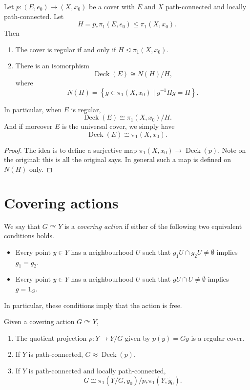 \begin{proposition}
\label{proposition-deck-normalizer}
Let $p:(E,e_0)\to(X,x_0)$ be a cover
with $E$ and $X$ path-connected and
locally path-connected. Let
$$
H=p_*\pi_1(E,e_0)\leq\pi_1(X,x_0).
$$
Then
\begin{enumerate}
\item The cover is regular if and only
if $H\trianglelefteq\pi_1(X,x_0)$.
\item There is an isomorphism
$$
\operatorname{Deck}(E)\cong N(H)/H,
$$
where
$$
N(H)=\left\{g\in\pi_1(X,x_0)
\mid g^{-1}Hg=H\right\}.
$$
\end{enumerate}
In particular, when $E$ is regular,
$$
\operatorname{Deck}(E)\cong
\pi_1(X,x_0)/H.
$$
And if moreover $E$ is the universal
cover, we simply have
$$
\operatorname{Deck}(E)\cong
\pi_1(X,x_0).
$$
\end{proposition}

\begin{proof}
The idea is to define a surjective map
$\pi_1(X,x_0)\to
\operatorname{Deck}(p)$.
Note on the original: this is all the
original says. In general such a map is
defined on $N(H)$ only.
\end{proof}

\section{Covering actions}
\label{section-covering-actions}

\begin{definition}
\label{definition-covering-action}
We say that $G\curvearrowright Y$ is a
{\it covering action} if either of the
following two equivalent conditions
holds.
\begin{itemize}
\item Every point $y\in Y$ has a
neighbourhood $U$ such that
$g_1U\cap g_2U\neq\emptyset$ implies
$g_1=g_2$.
\item Every point $y\in Y$ has a
neighbourhood $U$ such that
$gU\cap U\neq\emptyset$ implies
$g=1_G$.
\end{itemize}
In particular, these conditions imply
that the action is free.
\end{definition}

\begin{proposition}
\label{proposition-covering-action}
Given a covering action
$G\curvearrowright Y$,
\begin{enumerate}
\item The quotient projection
$p:Y\to Y/G$ given by $p(y)=Gy$ is a
regular cover.
\item If $Y$ is path-connected,
$G\approx\operatorname{Deck}(p)$.
\item If $Y$ is path-connected and
locally path-connected,
$$
G\cong\pi_1(Y/G,y_0)\big/
p_*\pi_1(Y,\tilde{y}_0).
$$
\end{enumerate}
\end{proposition}

